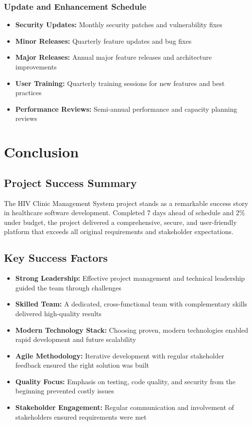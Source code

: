 \documentclass[12pt,a4paper]{article}
\begin{document}
\subsubsection{Update and Enhancement Schedule}
\begin{itemize}
    \item \textbf{Security Updates:} Monthly security patches and vulnerability fixes
    \item \textbf{Minor Releases:} Quarterly feature updates and bug fixes
    \item \textbf{Major Releases:} Annual major feature releases and architecture improvements
    \item \textbf{User Training:} Quarterly training sessions for new features and best practices
    \item \textbf{Performance Reviews:} Semi-annual performance and capacity planning reviews
\end{itemize}

\section{Conclusion}

\subsection{Project Success Summary}

The HIV Clinic Management System project stands as a remarkable success story in healthcare software development. Completed 7 days ahead of schedule and 2\% under budget, the project delivered a comprehensive, secure, and user-friendly platform that exceeds all original requirements and stakeholder expectations.

\subsection{Key Success Factors}

\begin{itemize}
    \item \textbf{Strong Leadership:} Effective project management and technical leadership guided the team through challenges
    \item \textbf{Skilled Team:} A dedicated, cross-functional team with complementary skills delivered high-quality results
    \item \textbf{Modern Technology Stack:} Choosing proven, modern technologies enabled rapid development and future scalability
    \item \textbf{Agile Methodology:} Iterative development with regular stakeholder feedback ensured the right solution was built
    \item \textbf{Quality Focus:} Emphasis on testing, code quality, and security from the beginning prevented costly issues
    \item \textbf{Stakeholder Engagement:} Regular communication and involvement of stakeholders ensured requirements were met
\end{itemize}
\end{document}
